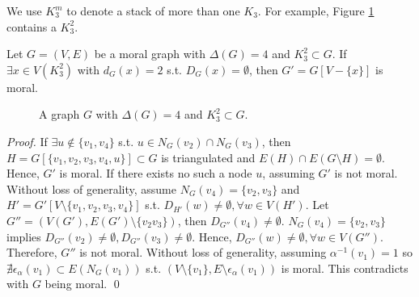 We use $K_3^m$ to denote a stack of more than one $K_3$. For example, Figure \ref{fg:2k3s} contains a $K_3^2$. 
\begin{lemma}
\label{lm:2k3s}
Let $G=(V,E)$ be a moral graph with $\Delta(G)=4$ and $K_3^2 \subset G$. If $\exists x\in V(K_3^2)$ with $d_G(x)=2$ s.t. $D_G(x)=\emptyset$, then $G'=G[V - \{x\}]$ is moral.
\begin{figure}[H]
\centering
{}
\caption{A graph $G$ with $\Delta(G)=4$ and $K_3^2\subset G$.}
\label{fg:2k3s}
\end{figure}
\end{lemma}
\begin{proof}
If $\exists u \notin \{v_1,v_4\}$ s.t. $u \in N_G(v_2)\cap N_G(v_3)$, then $H=G[\{v_1,v_2,v_3,v_4,u\}]\subset G$ is triangulated and $E(H)\cap E(G\setminus H)=\emptyset$. Hence, $G'$ is moral. If there exists no such a node $u$, assuming $G'$ is not moral. Without loss of generality, assume $N_G(v_4)=\{v_2,v_3\}$ and $H'=G'[V\setminus \{v_1,v_2,v_3,v_4\}]$ s.t. $D_{H'}(w)\neq \emptyset, \forall w\in V(H')$. Let $G'' = (V(G'), E(G')\setminus\{v_2v_3\})$, then $D_{G''}(v_4)\neq \emptyset$. $N_G(v_4)=\{v_2,v_3\}$ implies $D_{G''}(v_2)\neq \emptyset, D_{G''}(v_3)\neq \emptyset$. Hence, $D_{G''}(w)\neq \emptyset, \forall w\in V(G'')$. Therefore, $G''$ is not moral. Without loss of generality, assuming $\alpha^{-1}(v_1)=1$ so $\nexists \epsilon_{\alpha}(v_1) \subset E(N_G(v_1))$ s.t. $(V \setminus \{v_1\}, E \setminus \epsilon_{\alpha}(v_1))$ is moral. This contradicts with $G$ being moral. \qed
\end{proof}

